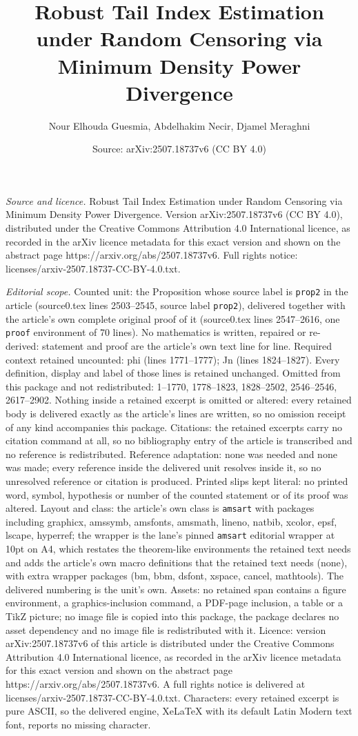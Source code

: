 \documentclass[10pt,a4paper]{amsart}
\title[Robust Tail Index Estimation under Random Censoring via Mini]{Robust Tail Index Estimation under Random Censoring via Minimum Density Power Divergence}
\author{Nour Elhouda Guesmia, Abdelhakim Necir, Djamel Meraghni}
\date{Source: arXiv:2507.18737v6 (CC BY 4.0)}
\begin{document}
\maketitle

\noindent\emph{Source and licence.} Robust Tail Index Estimation under Random Censoring via Minimum Density Power Divergence. Version arXiv:2507.18737v6 (CC BY 4.0), distributed under the Creative Commons Attribution 4.0 International licence, as recorded in the arXiv licence metadata for this exact version and shown on the abstract page https://arxiv.org/abs/2507.18737v6. Full rights notice: licenses/arxiv-2507.18737-CC-BY-4.0.txt.\par\smallskip

\noindent\textit{Editorial scope.} Counted unit: the Proposition whose source label is \texttt{prop2} in the article (source0.tex lines 2503--2545, source label \texttt{prop2}), delivered together with the article's own complete original proof of it (source0.tex lines 2547--2616, one \texttt{proof} environment of 70 lines). No mathematics is written, repaired or re-derived: statement and proof are the article's own text line for line. Required context retained uncounted: phi (lines 1771--1777); Jn (lines 1824--1827). Every definition, display and label of those lines is retained unchanged. Omitted from this package and not redistributed: 1--1770, 1778--1823, 1828--2502, 2546--2546, 2617--2902. Nothing inside a retained excerpt is omitted or altered: every retained body is delivered exactly as the article's lines are written, so no omission receipt of any kind accompanies this package. Citations: the retained excerpts carry no citation command at all, so no bibliography entry of the article is transcribed and no reference is redistributed. Reference adaptation: none was needed and none was made; every reference inside the delivered unit resolves inside it, so no unresolved reference or citation is produced. Printed slips kept literal: no printed word, symbol, hypothesis or number of the counted statement or of its proof was altered. Layout and class: the article's own class is \texttt{amsart} with packages including graphicx, amssymb, amsfonts, amsmath, lineno, natbib, xcolor, epsf, lscape, hyperref; the wrapper is the lane's pinned \texttt{amsart} editorial wrapper at 10pt on A4, which restates the theorem-like environments the retained text needs and adds the article's own macro definitions that the retained text needs (none), with extra wrapper packages (bm, bbm, dsfont, xspace, cancel, mathtools). The delivered numbering is the unit's own. Assets: no retained span contains a figure environment, a graphics-inclusion command, a PDF-page inclusion, a table or a TikZ picture; no image file is copied into this package, the package declares no asset dependency and no image file is redistributed with it. Licence: version arXiv:2507.18737v6 of this article is distributed under the Creative Commons Attribution 4.0 International licence, as recorded in the arXiv licence metadata for this exact version and shown on the abstract page https://arxiv.org/abs/2507.18737v6. A full rights notice is delivered at licenses/arxiv-2507.18737-CC-BY-4.0.txt. Characters: every retained excerpt is pure ASCII, so the delivered engine, XeLaTeX with its default Latin Modern text font, reports no missing character.
\end{document}
